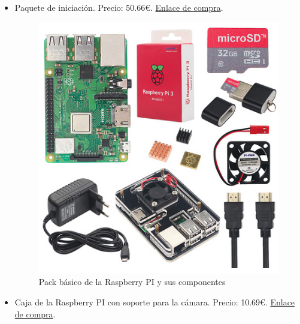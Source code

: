 \begin{itemize}
\item Paquete de iniciación. Precio: 50.66\euro.  \href{https://es.aliexpress.com/item/32919276764.html?spm=a2g0o.productlist.0.0.68c17409mViI9v&s=p&algo_pvid=3b970bb1-7255-4a8b-a98d-624a8c9b16c7&algo_expid=3b970bb1-7255-4a8b-a98d-624a8c9b16c7-1&btsid=cb6fa330-c76b-4821-ae48-adb8325769c2&ws_ab_test=searchweb0_0,searchweb201602_10,searchweb201603_53}{Enlace de compra}.

\begin{figure}[H]
	\centering
	\includegraphics[scale=0.4]{images/50}
	\caption{Pack básico de la Raspberry PI y sus componentes}
\end{figure}

\newpage

\item Caja de la Raspberry PI con soporte para la cámara. Precio: 10.69\euro. \href{https://es.aliexpress.com/item/32672860034.html?spm=a2g0s.9042311.0.0.683c63c0C8GUcZ}{Enlace de compra}.


\end{itemize}
